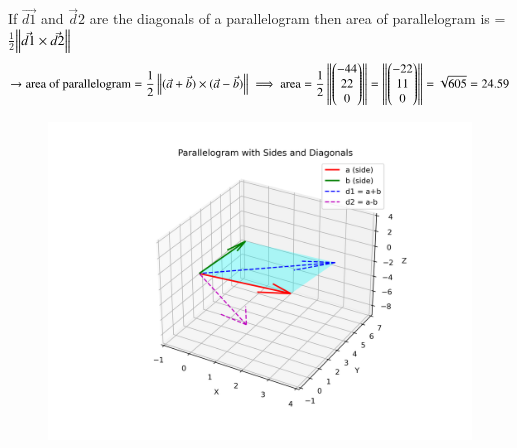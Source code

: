 \documentclass[journal]{IEEEtran}
\begin{document}
 If $\Vec{d1}$ and $\Vec{d}2$ are the diagonals of a parallelogram then area of parallelogram is =$\frac{1}{2}$$\left\lVert\Vec{d1}\times\Vec{d2}\right\rVert$\\
 \begin{align}
\rightarrow \text{area of parallelogram}=\frac{1}{2}\left\lVert(\Vec{a}+\Vec{b})\times(\Vec{a}-\Vec{b})\right\rVert
\implies \text{area}=\frac{1}{2}\left\lVert\begin{pmatrix}-44\\22\\0\end{pmatrix}\right\rVert=\left\lVert\begin{pmatrix}-22\\11\\0\end{pmatrix}\right\rVert
= \sqrt{605}=24.59\end{align}
\begin{figure}[H]
    \centering
    \includegraphics[width=0.66\columnwidth]{figs/01.png}
    \label{fig-1}
\end{figure}
   
\end{document}
